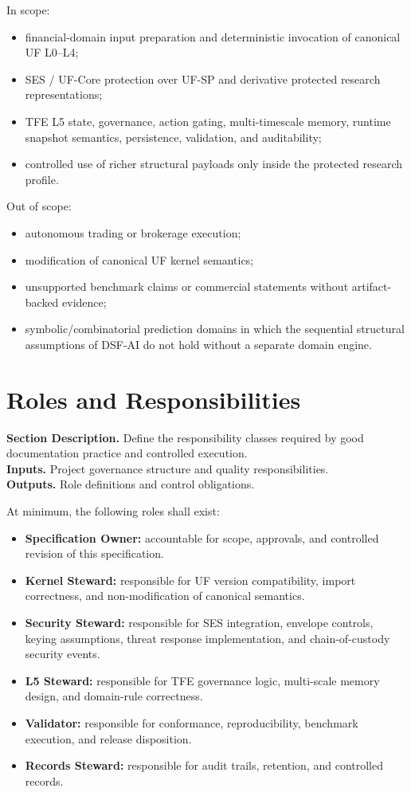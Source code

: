 \documentclass[11pt]{report}
\newcommand{\meta}[3]{\textbf{Section Description.} #1\\
\textbf{Inputs.} #2\\
\textbf{Outputs.} #3\par}
\begin{document}
In scope:
\begin{itemize}
    \item financial-domain input preparation and deterministic invocation of canonical UF L0--L4;
    \item SES / UF-Core protection over UF-SP and derivative protected research representations;
    \item TFE L5 state, governance, action gating, multi-timescale memory, runtime snapshot semantics, persistence, validation, and auditability;
    \item controlled use of richer structural payloads only inside the protected research profile.
\end{itemize}

Out of scope:
\begin{itemize}
    \item autonomous trading or brokerage execution;
    \item modification of canonical UF kernel semantics;
    \item unsupported benchmark claims or commercial statements without artifact-backed evidence;
    \item symbolic/combinatorial prediction domains in which the sequential structural assumptions of DSF-AI do not hold without a separate domain engine.
\end{itemize}

\section{Roles and Responsibilities}
\meta{Define the responsibility classes required by good documentation practice and controlled execution.}{Project governance structure and quality responsibilities.}{Role definitions and control obligations.}

At minimum, the following roles shall exist:
\begin{itemize}
    \item \textbf{Specification Owner:} accountable for scope, approvals, and controlled revision of this specification.
    \item \textbf{Kernel Steward:} responsible for UF version compatibility, import correctness, and non-modification of canonical semantics.
    \item \textbf{Security Steward:} responsible for SES integration, envelope controls, keying assumptions, threat response implementation, and chain-of-custody security events.
    \item \textbf{L5 Steward:} responsible for TFE governance logic, multi-scale memory design, and domain-rule correctness.
    \item \textbf{Validator:} responsible for conformance, reproducibility, benchmark execution, and release disposition.
    \item \textbf{Records Steward:} responsible for audit trails, retention, and controlled records.
\end{itemize}
\end{document}
